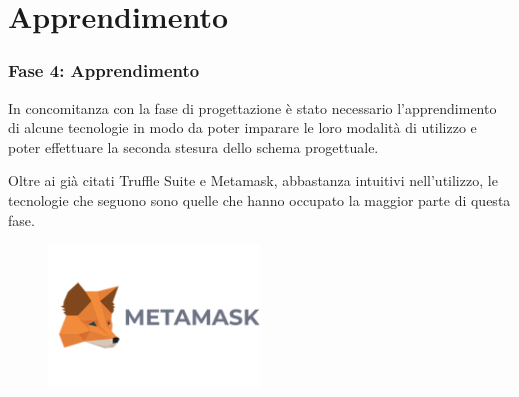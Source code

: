 \documentclass{beamer}
\begin{document}
\section{Apprendimento}
\begin{frame}
	\frametitle{Fase 4: Apprendimento}
	In concomitanza con la fase di progettazione è stato necessario l’apprendimento di alcune tecnologie in modo da poter imparare le loro modalità di utilizzo e poter effettuare la seconda stesura dello schema progettuale.

	Oltre ai già citati Truffle Suite e Metamask, abbastanza intuitivi nell'utilizzo, le tecnologie che seguono sono quelle che hanno occupato la maggior parte di questa fase.
	\begin{figure}
		\includegraphics[width=0.50\textwidth]{figures/metamask.png}
	\end{figure}
\end{frame}
\end{document}

